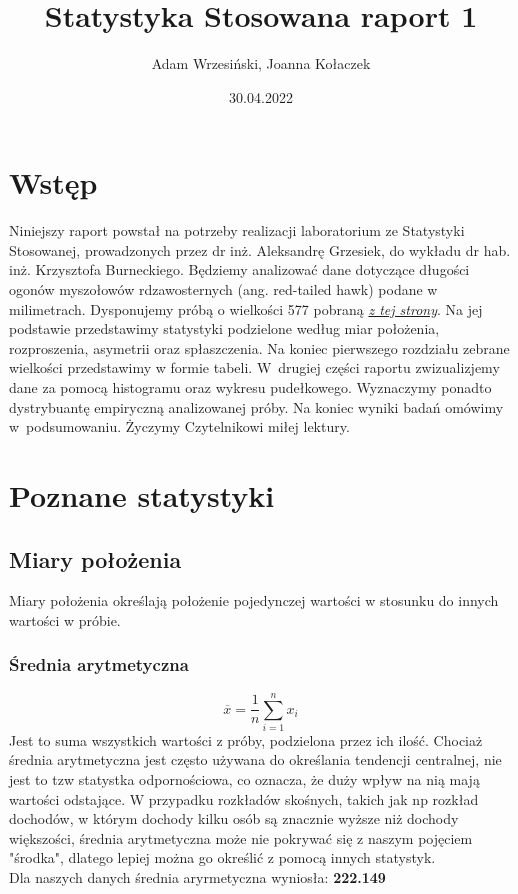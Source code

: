 \documentclass{article}
\title{Statystyka Stosowana raport 1}
\author{Adam Wrzesiński, Joanna Kołaczek}
\date{30.04.2022}
\theoremstyle{break}
\begin{document}
	\maketitle
	\tableofcontents
	\clearpage
	\section{Wstęp}
	
	Niniejszy raport powstał na potrzeby realizacji laboratorium ze Statystyki Stosowanej, prowadzonych przez dr inż. Aleksandrę Grzesiek, do wykładu dr hab. inż. Krzysztofa Burneckiego. Będziemy analizować dane dotyczące długości ogonów myszołowów rdzawosternych (ang. red-tailed hawk) podane w milimetrach. Dysponujemy próbą o wielkości 577 pobraną \href{ https://vincentarelbundock.github.io/Rdatasets/datasets.html}{\textit{z tej strony}}. Na jej podstawie przedstawimy statystyki podzielone według miar położenia, rozproszenia, asymetrii oraz spłaszczenia. Na koniec pierwszego rozdziału zebrane wielkości przedstawimy w formie tabeli.  W~drugiej części raportu zwizualizjemy dane za pomocą histogramu oraz wykresu pudełkowego. Wyznaczymy ponadto dystrybuantę empiryczną analizowanej próby. Na koniec wyniki badań omówimy w~podsumowaniu. Życzymy Czytelnikowi miłej lektury.
	
	\section{Poznane statystyki}
	\subsection{Miary położenia}
	
	Miary położenia określają położenie pojedynczej wartości w stosunku do innych wartości w próbie. 
	
	\subsubsection*{Średnia arytmetyczna}
	$$\overline{x}=\frac{1}{n}\sum\limits_{i=1}^{n}x_i$$
	Jest to suma wszystkich wartości z próby, podzielona przez ich ilość. Chociaż średnia arytmetyczna jest często używana do określania tendencji centralnej, nie jest to tzw statystka odpornościowa, co oznacza, że duży wpływ na nią mają wartości odstające. W przypadku rozkładów skośnych, takich jak np rozkład dochodów, w którym dochody kilku osób są znacznie wyższe niż dochody większości, średnia arytmetyczna może nie pokrywać się z naszym pojęciem "środka", dlatego lepiej można go określić z pomocą innych statystyk.\\
	Dla naszych danych średnia aryrmetyczna wyniosła: \textbf{222.149}
\end{document}
